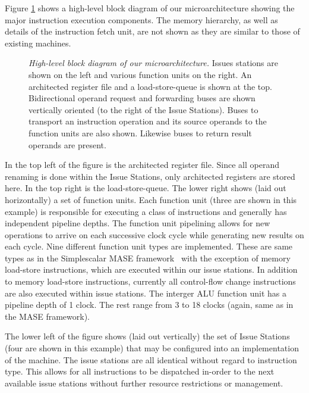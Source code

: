 \documentclass[10pt,dvips]{article}
\begin{document}
Figure \ref{fig:overview} shows a high-level block diagram
of our microarchitecture showing the major instruction execution components.
The memory hierarchy, as well as details of the instruction fetch
unit, are not shown as they are similar to those of existing
machines.
%
\begin{figure}
\centering
\scriptsize {
}
\caption{{\em High-level block diagram of our microarchitecture.} 
Issues stations are shown on the left and various function
units on the right.  An architected register file and a
load-store-queue is shown at the top.
Bidirectional operand request and forwarding buses are shown
vertically oriented (to the right of the Issue Stations).
Buses to transport an instruction operation and its source operands
to the function units are also shown. 
Likewise buses to return result operands are present.}
\label{fig:overview}
\end{figure}
%
In the top left of the figure is the architected register file.
Since all operand renaming is done within the Issue Stations,
only architected registers are stored here.
In the top right is the load-store-queue.
The lower right shows (laid out horizontally) a set of function units.
Each function unit (three are shown in this example)
is responsible for executing a class of
instructions and generally has independent pipeline depths.
The function unit pipelining allows for new operations to arrive
on each successive clock cycle while generating new results on
each cycle.
Nine different function unit types are implemented.
These are same types as in
the Simplescalar MASE framework~\cite{Austin97} with the
exception of memory load-store instructions, which are executed within our
issue stations.
In addition to memory load-store instructions, currently
all control-flow change instructions are also executed within
issue stations.
The interger ALU function unit has a pipeline depth of 1 clock.
The rest range from 3 to 18 clocks (again, same as in the MASE
framework).

The lower left of the figure shows (laid out vertically) the set of
Issue Stations (four are shown in this example)
that may be configured into an implementation of
the machine.
The issue stations are all identical without regard to 
instruction type.  This allows for all instructions to be
dispatched in-order to the next available issue stations 
without further resource restrictions or management.
\end{document}

